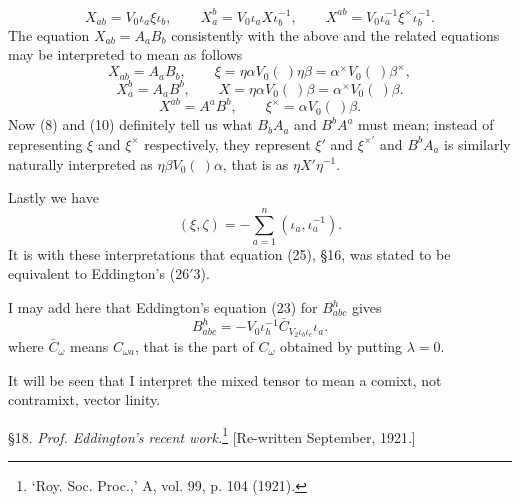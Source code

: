 \documentclass[11pt]{article}
\begin{document}
\begin{equation}X_{ab}=V_0\iota_a\xi\iota_b,\qquad X_a^b=V_0\iota_aX\iota_b^{-1},\qquad X^{ab}=V_0\iota_a^{-1}\xi^\times\iota_b^{-1}.\tag{7}\end{equation}
The equation $X_{ab}=A_aB_b$ consistently with the above and the related equations may be interpreted to mean as follows
\begin{equation}X_{ab}=A_aB_b,\qquad \xi=\eta\alpha V_0(\ )\eta\beta=\alpha^\times V_0(\ )\beta^\times,\tag{8}\end{equation}
\begin{equation}X_a^b=A_aB^b,\qquad X=\eta\alpha V_0(\ )\beta=\alpha^\times V_0(\ )\beta.\tag{9}\end{equation}
\begin{equation}X^{ab}=A^aB^b,\qquad \xi^\times=\alpha V_0(\ )\beta.\tag{10}\end{equation}
Now (8) and (10) definitely tell us what $B_bA_a$ and $B^bA^a$ must mean; instead of representing $\xi$ and $\xi^\times$ respectively, they represent $\xi'$ and $\xi^{\times\prime}$ and $B^bA_a$ is similarly naturally interpreted as $\eta\beta V_0(\ )\alpha$, that is as $\eta X'\eta^{-1}$.

\indent Lastly we have
\begin{equation}(\xi,\zeta)=-\sum_{a=1}^n(\iota_a,\iota_a^{-1}).\tag{11}\end{equation}
It is with these interpretations that equation (25), \S16, was stated to be equivalent to Eddington's (26$'$3).

\indent I may add here that Eddington's equation (23) for $B_{abc}^h$ gives
\begin{equation}B_{abc}^h=-V_0\iota_h^{-1}\bar C_{V_2\iota_b\iota_c}\iota_a.\tag{12}\end{equation}
where $\bar C_\omega$ means $C_{\omega a}$, that is the part of $C_\omega$ obtained by putting $\lambda=0$.

\indent It will be seen that I interpret the mixed tensor to mean a comixt, not contramixt, vector linity.

\indent \S18. \emph{Prof. Eddington's recent work.}{\renewcommand{\thefootnote}{*}\footnote{‘Roy. Soc. Proc.,’ A, vol. 99, p. 104 (1921).}} [Re-written September, 1921.]
\end{document}
